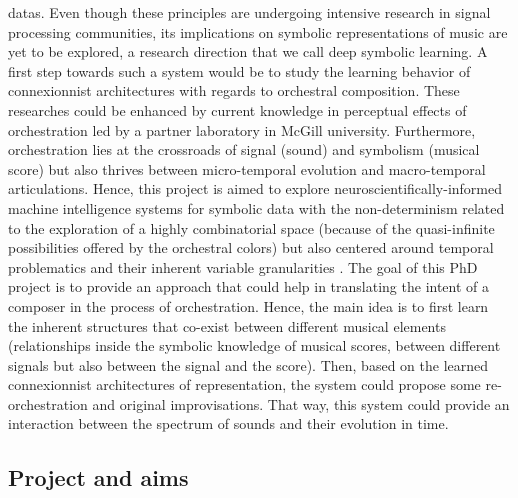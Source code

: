 \documentclass[10pt]{article}
\begin{document}
datas. Even though these principles are undergoing intensive research in signal processing communities, its implications on symbolic representations of music are yet to be explored, a research direction that we call deep symbolic learning. A first step towards such a system would be to study the learning behavior of connexionnist architectures with regards to orchestral composition. These researches could be enhanced by current knowledge in perceptual effects of orchestration led by a partner laboratory in McGill university. Furthermore, orchestration lies at the crossroads of signal (sound) and symbolism (musical score) but also thrives between micro-temporal evolution and macro-temporal articulations. Hence, this project is aimed to explore neuroscientifically-informed machine intelligence systems for symbolic data with the non-determinism related to the exploration of a highly combinatorial space (because of the quasi-infinite possibilities offered by the orchestral colors) but also centered around temporal problematics and their inherent variable granularities \cite{esling2012time}. The goal of this PhD project is to provide an approach that could help in translating the intent of a composer in the process of orchestration. Hence, the main idea is to first learn the inherent structures that co-exist between different musical elements (relationships inside the symbolic knowledge of musical scores, between different signals but also between the signal and the score). Then, based on the learned connexionnist architectures of representation, the system could propose some re-orchestration and original improvisations. That way, this system could provide an interaction between the spectrum of sounds and their evolution in time.

\noindent\makebox[\linewidth]{\rule{\textwidth}{2pt}}
\subsection*{Project and aims}
\noindent\makebox[\linewidth]{\rule{\textwidth}{2pt}}
\end{document}
